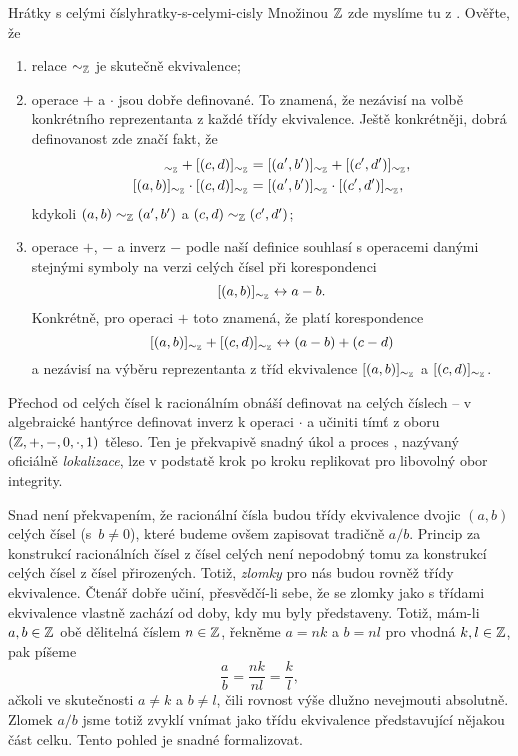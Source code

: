 \begin{exercise}{Hrátky s celými čísly}{hratky-s-celymi-cisly}
 Množinou $\mathbb{Z}$ zde myslíme tu z . Ověřte, že
 \begin{enumerate}
  \item relace $ \sim _{\mathbb{Z}}$ je skutečně ekvivalence;
  \item operace $+$ a $ \cdot $ jsou dobře definované. To znamená, že nezávisí
   na volbě konkrétního reprezentanta z každé třídy ekvivalence. Ještě
   konkrétněji, dobrá definovanost zde značí fakt, že
   \begin{align*}
    [(a,b)]_{ \sim_{\Z}} + [(c,d)]_{ \sim _{\Z}} &= [(a',b')]_{ \sim _{\Z}} +
    [(c',d')]_{ \sim _{\Z}},\\
    [(a,b)]_{ \sim_{\Z}} \cdot [(c,d)]_{ \sim _{\Z}} &= [(a',b')]_{ \sim _{\Z}}
    \cdot [(c',d')]_{ \sim _{\Z}},
   \end{align*}
   kdykoli $(a,b) \sim _{\mathbb{Z}} (a',b')$ a $(c,d) \sim _{\mathbb{Z}} (c',d')$;
  \item operace $+$, $-$ a inverz $-$ podle naší definice souhlasí s operacemi
   danými stejnými symboly na  verzi celých čísel při korespondenci
   \[
    [(a,b)]_{ \sim_{\mathbb{Z}}} \leftrightarrow a - b.
   \]
   Konkrétně, pro operaci $+$ toto znamená, že platí korespondence
   \[
    [(a,b)]_{ \sim_{\mathbb{Z}}} + [(c,d)]_{ \sim _{\mathbb{Z}}} \leftrightarrow (a - b) + (c -
    d)
   \]
   a nezávisí na výběru reprezentanta z tříd ekvivalence $[(a,b)]_{ \sim _{\mathbb{Z}}}$
   a $[(c,d)]_{ \sim_{\mathbb{Z}}}$.
 \end{enumerate}
\end{exercise}

Přechod od celých čísel k racionálním obnáší definovat na celých číslech
 -- v algebraické hantýrce definovat inverz k operaci $ \cdot $ a
učiniti tímť z oboru $(\mathbb{Z},+,-,0, \cdot ,1)$ těleso. Ten je překvapivě snadný
úkol a proces , nazývaný oficiálně \emph{lokalizace}, lze v
podstatě krok po kroku replikovat pro libovolný obor integrity.

Snad není překvapením, že racionální čísla budou třídy ekvivalence dvojic
$(a,b)$ celých čísel (s~$b \neq 0$), které budeme ovšem zapisovat tradičně $a /
b$. Princip za konstrukcí racionálních čísel z čísel celých není nepodobný tomu
za konstrukcí celých čísel z čísel přirozených. Totiž, \emph{zlomky} pro nás
budou rovněž třídy ekvivalence. Čtenář dobře učiní, přesvědčí-li sebe, že se
zlomky jako s třídami ekvivalence vlastně zachází od doby, kdy mu byly
představeny. Totiž, mám-li $a,b \in \mathbb{Z}$ obě dělitelná číslem $n \in \mathbb{Z}$, řekněme
$a = nk$ a $b = nl$ pro vhodná $k,l \in \mathbb{Z}$, pak píšeme
\[
 \frac{a}{b} = \frac{nk}{nl} = \frac{k}{l},
\]
ačkoli ve skutečnosti $a \neq k$ a $b \neq l$, čili rovnost výše dlužno
nevejmouti absolutně. Zlomek $a / b$ jsme totiž zvyklí vnímat jako třídu
ekvivalence představující nějakou část celku. Tento pohled je snadné
formalizovat.

